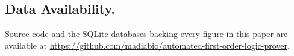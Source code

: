 \subsection{Data Availability.}
Source code and the SQLite databases backing every figure in this paper
are available at
\url{https://github.com/madiabio/automated-first-order-logic-prover}.
